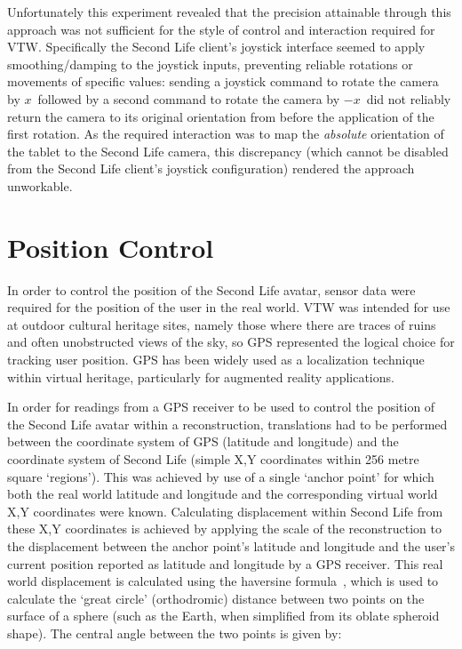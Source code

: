 Unfortunately this experiment revealed that the precision attainable through this approach was not sufficient for the style of control and interaction required for VTW. Specifically the Second Life client's joystick interface seemed to apply smoothing/damping to the joystick inputs, preventing reliable rotations or movements of specific values: sending a joystick command to rotate the camera by $x$\textdegree\ followed by a second command to rotate the camera by $-x$\textdegree\ did not reliably return the camera to its original orientation from before the application of the first rotation. As the required interaction was to map the \textit{absolute} orientation of the tablet to the Second Life camera, this discrepancy (which cannot be disabled from the Second Life client's joystick configuration) rendered the approach unworkable.


\section{Position Control}
\label{second_life_position_control}

In order to control the position of the Second Life avatar, sensor data were required for the position of the user in the real world. VTW was intended for use at outdoor cultural heritage sites, namely those where there are traces of ruins and often unobstructed views of the sky, so GPS represented the logical choice for tracking user position. GPS has been widely used as a localization technique within virtual heritage, particularly for augmented reality applications.


In order for readings from a GPS receiver to be used to control the position of the Second Life avatar within a reconstruction, translations had to be performed between the coordinate system of GPS (latitude and longitude) and the coordinate system of Second Life (simple X,Y coordinates within 256 metre square `regions'). This was achieved by use of a single `anchor point' for which both the real world latitude and longitude and the corresponding virtual world X,Y coordinates were known. Calculating displacement within Second Life from these X,Y coordinates is achieved by applying the scale of the reconstruction to the displacement between the anchor point's latitude and longitude and the user's current position reported as latitude and longitude by a GPS receiver. This real world displacement is calculated using the haversine formula~\cite{VanBrummelen2012}, which is used to calculate the `great circle' (orthodromic) distance between two points on the surface of a sphere (such as the Earth, when simplified from its oblate spheroid shape). The central angle  between the two points is given by:

